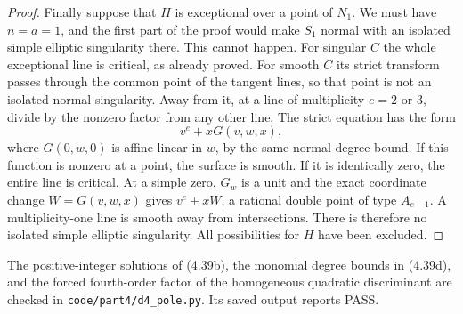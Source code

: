 \begin{proof}
Finally suppose that $H$ is exceptional over a point of $N_1$.
We must have $n=a=1$, and the first part of the proof would
make $S_1$ normal with an isolated simple elliptic singularity
there. This cannot happen. For singular $C$ the whole
exceptional line is critical, as already proved. For smooth
$C$ its strict transform passes through the common point of
the tangent lines, so that point is not an isolated normal
singularity. Away from it, at a line of multiplicity
$e=2$ or $3$, divide by the nonzero factor from any other
line. The strict equation has the form
\[
                         v^e+xG(v,w,x),
\]
where $G(0,w,0)$ is affine linear in $w$, by the same
normal-degree bound. If this function is nonzero at a point,
the surface is smooth. If it is identically zero, the entire
line is critical. At a simple zero, $G_w$ is a unit and the
exact coordinate change $W=G(v,w,x)$ gives $v^e+xW$, a
rational double point of type $A_{e-1}$. A multiplicity-one
line is smooth away from intersections. There is therefore
no isolated simple elliptic singularity. All possibilities
for $H$ have been excluded.
\end{proof}

The positive-integer solutions of (4.39b), the monomial degree
bounds in (4.39d), and the forced fourth-order factor of the
homogeneous quadratic discriminant are checked in
\texttt{code/part4/d4\_pole.py}. Its saved output reports PASS.
